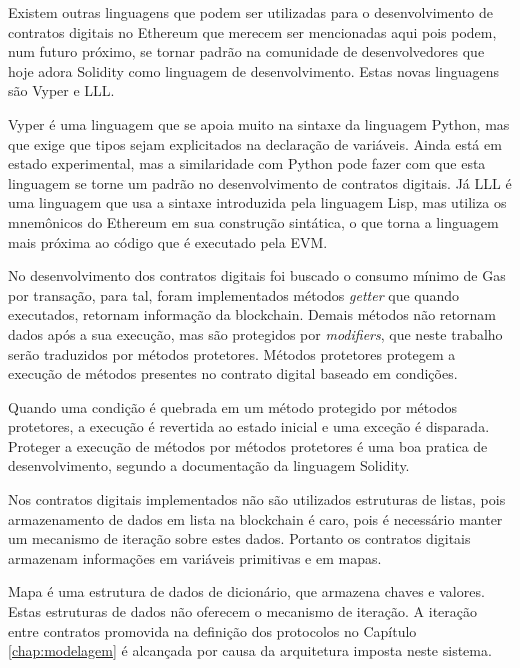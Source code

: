 \documentclass[tcc,capa]{texufpel}
\begin{document}
    Existem outras linguagens que podem ser utilizadas para o desenvolvimento de contratos digitais no Ethereum que merecem ser mencionadas aqui pois podem, num futuro próximo, se tornar padrão na comunidade de desenvolvedores que hoje adora Solidity como linguagem de desenvolvimento. Estas novas linguagens são Vyper e LLL.
    
    Vyper é uma linguagem que se apoia muito na sintaxe da linguagem Python, mas que exige que tipos sejam explicitados na declaração de variáveis. Ainda está em estado experimental, mas a similaridade com Python pode fazer com que esta linguagem se torne um padrão no desenvolvimento de contratos digitais. Já LLL é uma linguagem que usa a sintaxe introduzida pela linguagem Lisp, mas utiliza os mnemônicos do Ethereum em sua construção sintática, o que torna a linguagem mais próxima ao código que é executado pela EVM.
    
    No desenvolvimento dos contratos digitais foi buscado o consumo mínimo de Gas por transação, para tal, foram implementados métodos \textit{getter} que quando executados, retornam informação da blockchain. Demais métodos não retornam dados após a sua execução, mas são protegidos por \textit{modifiers}, que neste trabalho serão traduzidos por métodos protetores. Métodos protetores protegem a execução de métodos presentes no contrato digital baseado em condições.
    
    Quando uma condição é quebrada em um método protegido por métodos protetores, a execução é revertida ao estado inicial e uma exceção é disparada. Proteger a execução de métodos por métodos protetores é uma boa pratica de desenvolvimento, segundo a documentação da linguagem Solidity.
    
    Nos contratos digitais implementados não são utilizados estruturas de listas, pois armazenamento de dados em lista na blockchain é caro, pois é necessário manter um mecanismo de iteração sobre estes dados. Portanto os contratos digitais armazenam informações em variáveis primitivas e em mapas.
    
    Mapa é uma estrutura de dados de dicionário, que armazena chaves e valores. Estas estruturas de dados não oferecem o mecanismo de iteração. A iteração entre contratos promovida na definição dos protocolos no Capítulo \ref{chap:modelagem} é alcançada por causa da arquitetura imposta neste sistema.
\end{document}
